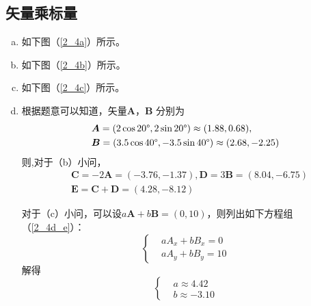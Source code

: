 \subsection{矢量乘标量}
\begin{enumerate}[(a)]
	\item 如下图（\ref{2_4a}）所示。
	\item 如下图（\ref{2_4b}）所示。
	\item 如下图（\ref{2_4c}）所示。
	\item 根据题意可以知道，矢量$\bm{A}$，$\bm{B}$ 分别为
	\[
	\begin{aligned}
	&\bm{A} = (2 \cos20\degree,2\sin20\degree) \approx  (1.88,0.68),\\
	&\bm{B} = (3.5 \cos40\degree,-3.5\sin40\degree) \approx (2.68,-2.25)
	\end{aligned}
	\]
则,对于（b）小问，
\[
\begin{aligned}
&\bm{C} = -2\bm{A} = (-3.76,-1.37),\bm{D} = 3\bm{B} = (8.04,-6.75)\\
&\bm{E} = \bm{C} + \bm{D} = (4.28,-8.12)
\end{aligned}
\]

对于（c）小问，可以设$ a \bm{A} + b \bm{B} = (0,10) $，则列出如下方程组（\ref{2_4d_e}）：
\begin{equation}
\left\{
\begin{aligned}
&aA_x + bB_x = 0 \\
&aA_y + bB_y = 10
\end{aligned}
\right.
\label{2_4d_e}
\end{equation}
解得
\[
\left\{
\begin{aligned}
&a \approx 4.42 \\
&b \approx -3.10
\end{aligned}
\right.
\]
\end{enumerate}

\begin{figure}[htbp]
	\centering
	\\
	\caption{}
	\label{2_4}	
\end{figure}
